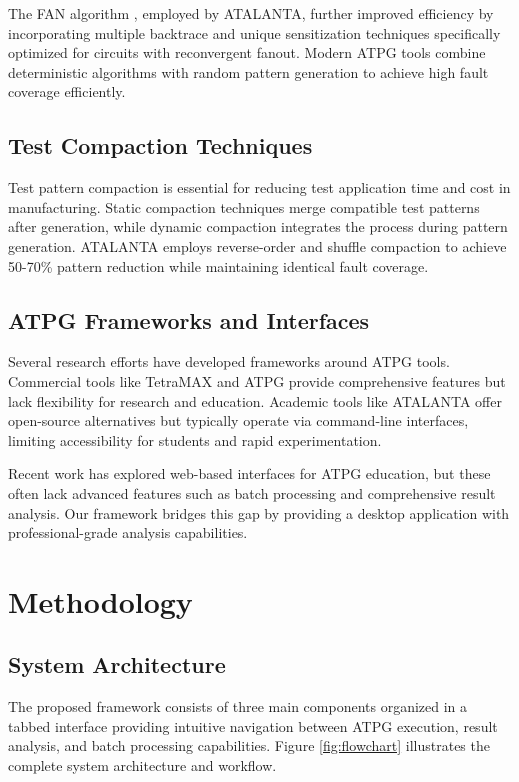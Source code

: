 \documentclass[conference]{IEEEtran}
\begin{document}
The FAN algorithm \cite{b3}, employed by ATALANTA, further improved efficiency by incorporating multiple backtrace and unique sensitization techniques specifically optimized for circuits with reconvergent fanout. Modern ATPG tools combine deterministic algorithms with random pattern generation to achieve high fault coverage efficiently.

\subsection{Test Compaction Techniques}

Test pattern compaction \cite{b4} is essential for reducing test application time and cost in manufacturing. Static compaction techniques merge compatible test patterns after generation, while dynamic compaction integrates the process during pattern generation. ATALANTA employs reverse-order and shuffle compaction to achieve 50-70\% pattern reduction while maintaining identical fault coverage.

\subsection{ATPG Frameworks and Interfaces}

Several research efforts have developed frameworks around ATPG tools. Commercial tools like TetraMAX and ATPG provide comprehensive features but lack flexibility for research and education. Academic tools like ATALANTA offer open-source alternatives but typically operate via command-line interfaces, limiting accessibility for students and rapid experimentation.

Recent work \cite{b5} has explored web-based interfaces for ATPG education, but these often lack advanced features such as batch processing and comprehensive result analysis. Our framework bridges this gap by providing a desktop application with professional-grade analysis capabilities.

\section{Methodology}

\subsection{System Architecture}

The proposed framework consists of three main components organized in a tabbed interface providing intuitive navigation between ATPG execution, result analysis, and batch processing capabilities. Figure \ref{fig:flowchart} illustrates the complete system architecture and workflow.
\end{document}
